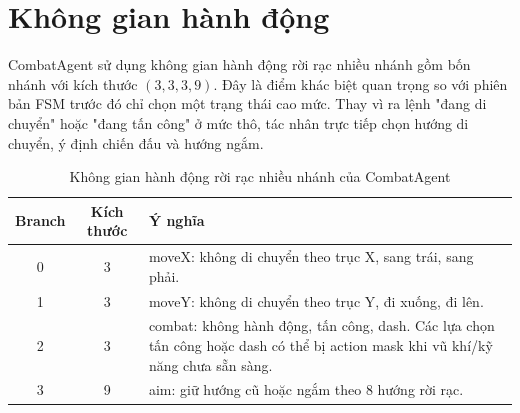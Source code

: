 \section{Không gian hành động}

CombatAgent sử dụng không gian hành động rời rạc nhiều nhánh gồm bốn nhánh với kích thước $(3,3,3,9)$. Đây là điểm khác biệt quan trọng so với phiên bản FSM trước đó chỉ chọn một trạng thái cao mức. Thay vì ra lệnh "đang di chuyển" hoặc "đang tấn công" ở mức thô, tác nhân trực tiếp chọn hướng di chuyển, ý định chiến đấu và hướng ngắm.

\begin{table}[H]
    \centering
    \small
    \caption{Không gian hành động rời rạc nhiều nhánh của CombatAgent}
    \label{tab:action_space}
    \begin{tabular}{|c|c|p{9cm}|}
        \hline
        \textbf{Branch} & \textbf{Kích thước} & \textbf{Ý nghĩa} \\
        \hline
        0 & 3 & moveX: không di chuyển theo trục X, sang trái, sang phải. \\
        \hline
        1 & 3 & moveY: không di chuyển theo trục Y, đi xuống, đi lên. \\
        \hline
        2 & 3 & combat: không hành động, tấn công, dash. Các lựa chọn tấn công hoặc dash có thể bị action mask khi vũ khí/kỹ năng chưa sẵn sàng. \\
        \hline
        3 & 9 & aim: giữ hướng cũ hoặc ngắm theo 8 hướng rời rạc. \\
        \hline
    \end{tabular}
\end{table}

